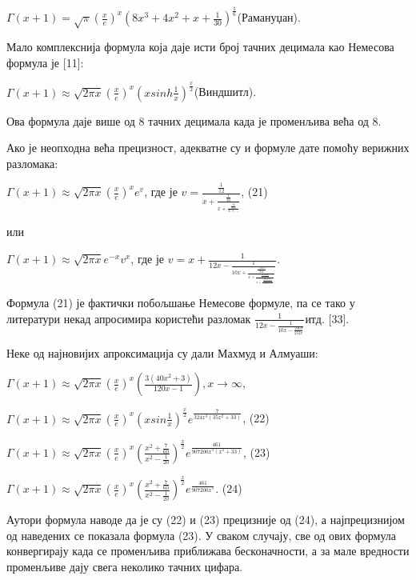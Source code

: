 \(\Gamma(x + 1) = \sqrt{\pi}\left( \frac{x}{e} \right)^{x}{(8x^{3} + 4x^{2} + x + \frac{1}{30})}^{\frac{1}{6}}\)(Рамануџан).

Мало комплекснија формула која даје исти број тачних децимала као
Немесова формула је {[}11{]}:

\(\Gamma(x + 1) \approx \sqrt{2\pi x}\left( \frac{x}{e} \right)^{x}\left( xsinh\frac{1}{x} \right)^{\frac{x}{2}}\)(Виндшитл).

Ова формула даје више од 8 тачних децимала када је променљива већа од 8.

Ако је неопходна већа прецизност, адекватне су и формуле дате помоћу
верижних разломака:

\(\Gamma(x + 1) \approx \sqrt{2\pi x}\left( \frac{x}{e} \right)^{x}e^{v}\),
где је
\(v = \frac{\frac{1}{12}}{x + \frac{\frac{1}{30}}{x + \frac{\frac{53}{210}}{x + ...}}}\),
(21)

или

\(\Gamma(x + 1) \approx \sqrt{2\pi x}e^{- x}v^{x}\), где је
\(v = x + \frac{1}{12x - \frac{1}{10x + \frac{\frac{- 2369}{252}}{x + \frac{\frac{2117009}{1193976}}{x + \frac{\frac{393032191511}{1324011300744}}{x + ...}}}}}\).

Формула (21) је фактички побољшање Немесове формуле, па се тако у
литератури некад апросимира користећи разломак
\(\frac{1}{12x - \frac{1}{10x - \frac{2369}{252x}}}\)итд. {[}33{]}.

Неке од најновијих апроксимација су дали Махмуд и Алмуаши:

\(\Gamma(x + 1) \approx \sqrt{2\pi x}\left( \frac{x}{e} \right)^{x}\left( \frac{3(40x^{2} + 3)}{120x - 1} \right),x \rightarrow \infty\),

\(\Gamma(x + 1) \approx \sqrt{2\pi x}\left( \frac{x}{e} \right)^{x}\left( xsin\frac{1}{x} \right)^{\frac{x}{2}}e^{\frac{7}{324x^{3}(35x^{2} + 33)}}\),
(22)

\(\Gamma(x + 1) \approx \sqrt{2\pi x}\left( \frac{x}{e} \right)^{x}\left( \frac{x^{2} + \frac{7}{60}}{x^{2} - \frac{1}{20}} \right)^{\frac{x}{2}}e^{\frac{461}{907200x^{3}(x^{2} + 33)}}\),
(23)

\(\Gamma(x + 1) \approx \sqrt{2\pi x}\left( \frac{x}{e} \right)^{x}\left( \frac{x^{2} + \frac{7}{60}}{x^{2} - \frac{1}{20}} \right)^{\frac{x}{2}}e^{\frac{461}{907200x^{5}}}\).
(24)

Аутори формула наводе да је су (22) и (23) прецизније од (24), а
најпрецизнијом од наведених се показала формула (23). У сваком случају,
све од ових формула конвергирају када се променљива приближава
бесконачности, а за мале вредности променљиве дају свега неколико тачних
цифара.

